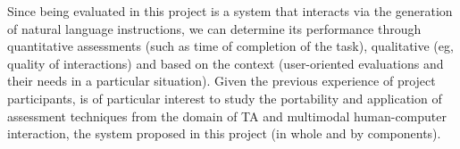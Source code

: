 Since being evaluated in this project is a system that interacts via the
generation of natural language instructions, we can determine its performance
through quantitative assessments (such as time of completion of the task),
qualitative (eg, quality of interactions) and based on the context
(user-oriented evaluations and their needs in a particular situation). Given the
previous experience of project participants, is of particular interest to study
the portability and application of assessment techniques from the domain of TA
and multimodal human-computer interaction, the system proposed in this project
(in whole and by components).
